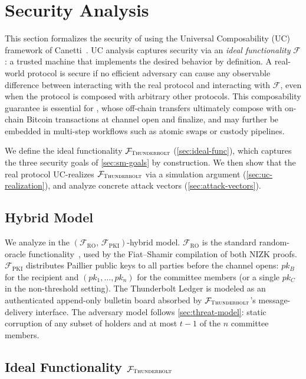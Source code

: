 \section{Security Analysis}\label{sec:security}

This section formalizes the security of \thunderbolt using the Universal Composability (UC) framework of Canetti~\cite{canetti2001uc}. UC analysis captures security via an \emph{ideal functionality} $\mathcal{F}$: a trusted machine that implements the desired behavior by definition. A real-world protocol is secure if no efficient adversary can cause any observable difference between interacting with the real protocol and interacting with $\mathcal{F}$, even when the protocol is composed with arbitrary other protocols. This composability guarantee is essential for \thunderbolt, whose off-chain transfers ultimately compose with on-chain Bitcoin transactions at channel open and finalize, and may further be embedded in multi-step workflows such as atomic swaps or custody pipelines.

We define the ideal functionality $\mathcal{F}_{\textsc{Thunderbolt}}$ (\autoref{sec:ideal-func}), which captures the three security goals of \autoref{sec:sm-goals} by construction. We then show that the real protocol UC-realizes $\mathcal{F}_{\textsc{Thunderbolt}}$ via a simulation argument (\autoref{sec:uc-realization}), and analyze concrete attack vectors (\autoref{sec:attack-vectors}).

\subsection{Hybrid Model}\label{sec:uc-hybrid}

We analyze \thunderbolt in the $(\mathcal{F}_{\mathrm{RO}},\, \mathcal{F}_{\mathrm{PKI}})$-hybrid model.
$\mathcal{F}_{\mathrm{RO}}$ is the standard random-oracle functionality~\cite{bellare1993random},
used by the Fiat--Shamir compilation of both NIZK proofs.
$\mathcal{F}_{\mathrm{PKI}}$ distributes Paillier public keys to all parties before the
channel opens: $pk_B$ for the recipient and $(pk_1, \ldots, pk_n)$ for the committee members (or a single $pk_C$ in the non-threshold setting).
The Thunderbolt Ledger is modeled as an authenticated append-only bulletin board absorbed by $\mathcal{F}_{\textsc{Thunderbolt}}$'s message-delivery interface.
The adversary model follows \autoref{sec:threat-model}: static corruption of any subset of holders
and at most $t-1$ of the $n$ committee members.

\subsection{Ideal Functionality $\mathcal{F}_{\textsc{Thunderbolt}}$}\label{sec:ideal-func}

